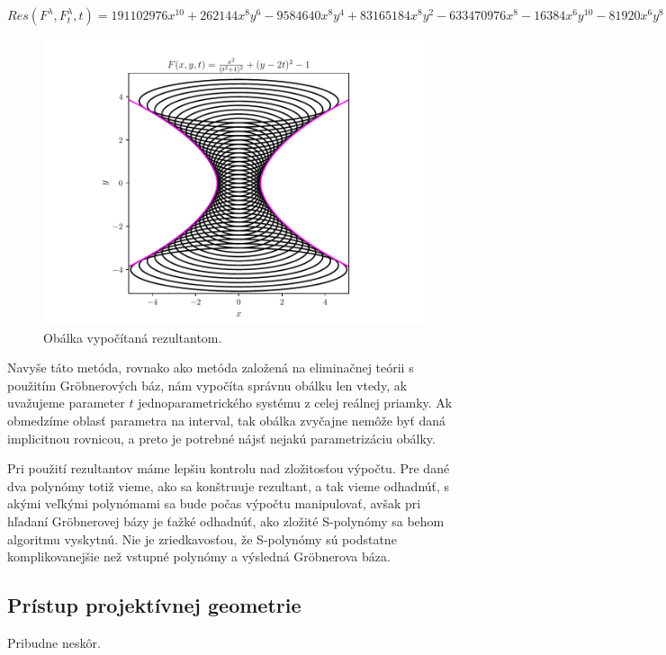 $ Res(F^\lambda , F_t^\lambda , t) = 191102976x^{10} + 262144x^8y^6 - 9584640x^8y^4 + 83165184x^8y^2 - 633470976x^8 - 16384x^6y^{10} - 81920x^6y^8 - 14483456x^6y^6 - 113311744x^6y^4 + 96419840x^6y^2 + 698368000x^6 - 16384x^4y^{12} - 294912x^4y^{10} - 2998272x^4y^8 - 18284544x^4y^6 - 74956800x^4y^4 - 184320000x^4y^2 - 256000000x^4. $

\begin{figure}[H]
	\centering
	\includegraphics{images/resultant.pdf}
	\caption{Obálka vypočítaná rezultantom.}
	\label{fig:resultant}
\end{figure}

Navyše táto metóda, rovnako ako metóda založená na eliminačnej teórii s použitím Gröbnerových báz, nám vypočíta správnu obálku len vtedy, ak uvažujeme parameter $t$ jednoparametrického systému z celej reálnej priamky. Ak obmedzíme oblasť parametra na interval, tak obálka zvyčajne nemôže byť daná implicitnou rovnicou, a preto je potrebné nájsť nejakú parametrizáciu obálky. 

Pri použití rezultantov máme lepšiu kontrolu nad zložitosťou výpočtu. Pre dané dva polynómy totiž vieme, ako sa konštruuje rezultant, a tak vieme odhadnúť, s akými veľkými polynómami sa bude počas výpočtu manipulovať, avšak pri hľadaní Gröbnerovej bázy je ťažké odhadnúť, ako zložité S-polynómy sa behom algoritmu vyskytnú. Nie je zriedkavosťou, že S-polynómy sú podstatne komplikovanejšie než vstupné polynómy a výsledná Gröbnerova báza.

\subsection{Prístup projektívnej geometrie}
Pribudne neskôr.

